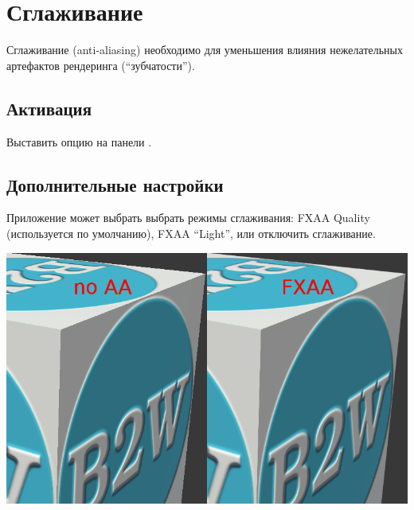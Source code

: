 \documentclass[a4paper,12pt,oneside]{sphinxmanual}
\begin{document}
\begin{DUlineblock}{0em}
\item[] 
\end{DUlineblock}


\section{Сглаживание}
\label{postprocessing_effects:antialiasing}\label{postprocessing_effects:id20}\label{postprocessing_effects:index-6}
Сглаживание (anti-aliasing) необходимо для уменьшения влияния нежелательных артефактов рендеринга (``зубчатости'').


\subsection{Активация}
\label{postprocessing_effects:id21}
Выставить опцию  на панели .


\subsection{Дополнительные настройки}
\label{postprocessing_effects:id22}
Приложение может выбрать выбрать режимы сглаживания: FXAA Quality (используется по умолчанию), FXAA ``Light'', или отключить сглаживание.

{\hfill\includegraphics[width=1.000\linewidth]{antialiasing.jpg}\hfill}

\begin{DUlineblock}{0em}
\item[] 
\end{DUlineblock}
\end{document}

